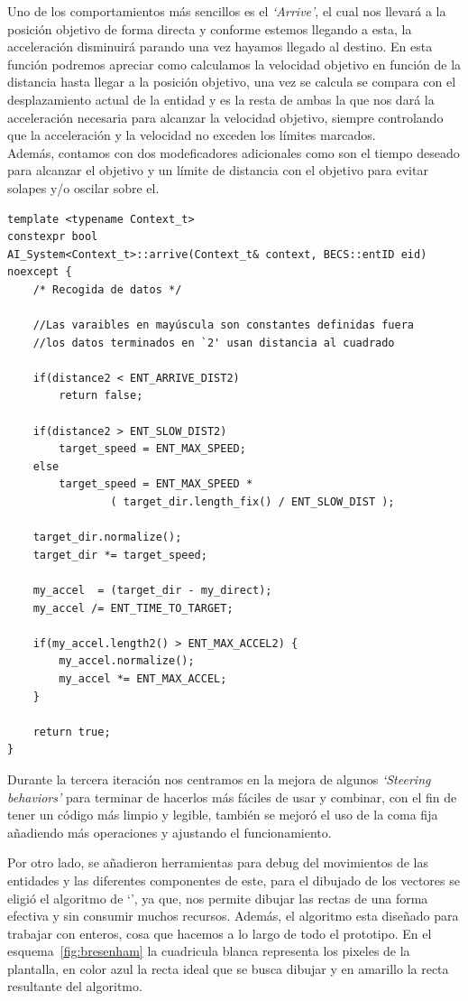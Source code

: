 Uno de los comportamientos más sencillos es el \textit{`Arrive'}, el cual nos
llevará a la posición objetivo de forma directa y conforme estemos llegando a esta, la 
acceleración disminuirá parando una vez hayamos llegado al destino. En esta función podremos
apreciar como calculamos la velocidad objetivo en función de la distancia hasta llegar a
la posición objetivo, una vez se calcula se compara con el desplazamiento actual de la entidad
y es la resta de ambas la que nos dará la acceleración necesaria para alcanzar la velocidad
objetivo, siempre controlando que la acceleración y la velocidad no exceden los límites 
marcados.\\
Además, contamos con dos modeficadores adicionales como son el tiempo deseado para alcanzar el
objetivo y un límite de distancia con el objetivo para evitar solapes y/o oscilar sobre el.

\begin{lstlisting}[style=CodigoC++, caption={Arrive behavior}, label=ia_arrive] 
template <typename Context_t>
constexpr bool
AI_System<Context_t>::arrive(Context_t& context, BECS::entID eid) noexcept {
    /* Recogida de datos */

    //Las varaibles en mayúscula son constantes definidas fuera
    //los datos terminados en `2' usan distancia al cuadrado

    if(distance2 < ENT_ARRIVE_DIST2)
        return false;

    if(distance2 > ENT_SLOW_DIST2)
        target_speed = ENT_MAX_SPEED;
    else
        target_speed = ENT_MAX_SPEED * 
        		( target_dir.length_fix() / ENT_SLOW_DIST );
    
    target_dir.normalize();
    target_dir *= target_speed;

    my_accel  = (target_dir - my_direct);
    my_accel /= ENT_TIME_TO_TARGET;

    if(my_accel.length2() > ENT_MAX_ACCEL2) {
        my_accel.normalize();
        my_accel *= ENT_MAX_ACCEL;
    }

    return true;
}
\end{lstlisting}

Durante la tercera iteración nos centramos en la mejora de algunos \textit{`Steering behaviors'}
para terminar de hacerlos más fáciles de usar y combinar, con el fin de tener un código más 
limpio y legible, también se mejoró el uso de la coma fija añadiendo más operaciones y ajustando
el funcionamiento.

Por otro lado, se añadieron herramientas para debug del movimientos de las entidades y las
diferentes componentes de este, para el dibujado de los vectores se eligió el algoritmo de
`\citeauthor*{Bresenham1962}', ya que, nos permite dibujar las rectas de una forma efectiva
y sin consumir muchos recursos. Además, el algoritmo esta diseñado para trabajar con enteros,
cosa que hacemos a lo largo de todo el prototipo. En el esquema~\ref{fig:bresenham} la 
cuadricula blanca representa los pixeles de la plantalla, en color azul la recta ideal que
se busca dibujar y en amarillo la recta resultante del algoritmo.

